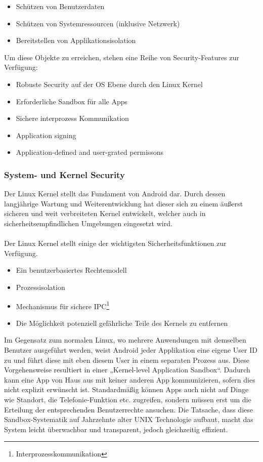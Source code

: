 \begin{itemize}
	\item Schützen von Benutzerdaten
	\item Schützen von Systemressourcen (inklusive Netzwerk)
	\item Bereitstellen von Applikationsisolation
\end{itemize}
Um diese Objekte zu erreichen, stehen eine Reihe von Security-Features zur Verfügung:
\begin{itemize}
	\item Robuste Security auf der OS Ebene durch den Linux Kernel
	\item Erforderliche Sandbox für alle Apps
	\item Sichere interprozess Kommunikation
	\item Application signing
	\item Application-defined and user-grated permissons
\end{itemize}

\subsubsection{System- und Kernel Security}
Der Linux Kernel stellt das Fundament von Android dar. Durch dessen langjährige Wartung und Weiterentwicklung hat dieser sich zu einem äußerst sicheren und weit verbreiteten Kernel entwickelt, welcher auch in sicherheitsempfindlichen Umgebungen eingesetzt wird.
\paragraph*{}
Der Linux Kernel stellt einige der wichtigsten Sicherheitsfunktionen zur Verfügung.
\begin{itemize}
	\item Ein benutzerbasiertes Rechtemodell
	\item Prozessisolation
	\item Mechanismus für sichere IPC\footnote{Interprozesskommunikation} 
	\item Die Möglichkeit potenziell gefährliche Teile des Kernels zu entfernen
\end{itemize}
Im Gegensatz zum normalen Linux, wo mehrere Anwendungen mit demselben Benutzer ausgeführt werden, weist Android jeder Applikation eine eigene User ID zu und führt diese mit eben diesem User in einem separaten Prozess aus.
Diese Vorgehensweise resultiert in einer „Kernel-level Application Sandbox“. Dadurch kann eine App von Haus aus mit keiner anderen App kommunizieren, sofern dies nicht explizit erwünscht ist. Standardmäßig können Apps auch nicht auf Dinge wie Standort, die Telefonie-Funktion etc. zugreifen, sondern müssen erst um die Erteilung der entsprechenden Benutzerrechte ansuchen. Die Tatsache, dass diese Sandbox-Systematik auf Jahrzehnte alter UNIX Technologie aufbaut, macht das System leicht überwachbar und transparent, jedoch gleichzeitig effizient.
